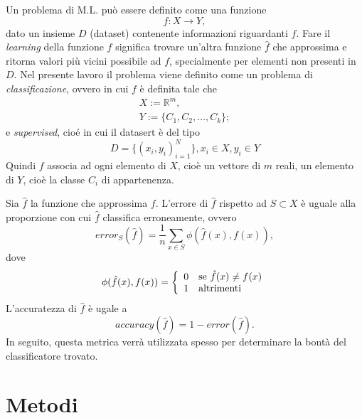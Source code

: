\documentclass[Lau,binding=0.6cm]{sapthesis}
\begin{document}
Un problema di M.L. pu\`o essere definito come una funzione 
\begin{equation}
f: X \to Y,\label{eq:3}
\end{equation}
dato un insieme $D$ (dataset) contenente informazioni riguardanti $f$.
Fare il \textit{learning} della funzione $f$ significa trovare un'altra funzione $\hat{f}$ che approssima e ritorna valori più vicini possibile ad $f$, specialmente per elementi non presenti in $D$.
Nel presente lavoro il problema viene definito come un problema di \textit{classificazione}, ovvero in cui $f$ \`e definita tale che
\begin{equation}
    \begin{array}{l}
    X := \mathbb{R}^m, \\
    Y := \{ C_1, C_2, \ldots, C_k \};
    \end{array}
\end{equation} 
e \textit{supervised}, cio\'e in cui il datasert \`e del tipo
\begin{equation}
    D = \{ (x_i, y_i)_{i=1}^N \}, x_i\in X, y_i\in Y
\end{equation}
Quindi $f$ associa ad ogni elemento di $X$, cio\`e un vettore di $m$ reali, un elemento di $Y$, cio\`e la classe $C_i$ di appartenenza.

Sia $\hat{f}$ la funzione che approssima $f$. L'errore di $\hat{f}$ rispetto ad $S \subset X$ \`e uguale alla proporzione con cui $\hat{f}$ classifica erroneamente, ovvero
\begin{equation}
    error_{S}(\hat{f}) = \frac{1}{n} \sum_{x\in S} \phi(\hat{f}(x), f(x)),
\end{equation}
dove
\begin{equation}
    \phi(\hat{f}(x), f(x)) = \left\{
        \begin{array}{rl}
            0 & \mbox{se $ \hat{f}(x) \ne f(x)$}\\
            1 & \mbox{altrimenti}
        \end{array}
    \right
    .
\end{equation}
L'accuratezza di $\hat{f}$ \`e ugale a
\begin{equation}
    accuracy(\hat{f}) = 1 - error(\hat{f}).
\end{equation}
In seguito, questa metrica verr\`a utilizzata spesso per determinare la bont\`a del classificatore trovato.


\chapter{Metodi}\label{chap:3}
\end{document}
